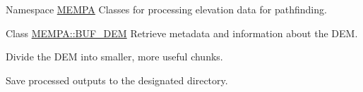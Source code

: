 
\begin{DoxyRefList}
\item[Namespace \mbox{\hyperlink{namespaceMEMPA}{MEMPA}} ]\label{todo__todo000001}%
%
Classes for processing elevation data for pathfinding. 
\item[Class \mbox{\hyperlink{classMEMPA_1_1BUF__DEM}{MEMPA\+::BUF\+\_\+\+DEM}} ]\label{todo__todo000002}%
%
Retrieve metadata and information about the DEM. 

Divide the DEM into smaller, more useful chunks. 

Save processed outputs to the designated directory.
\end{DoxyRefList}